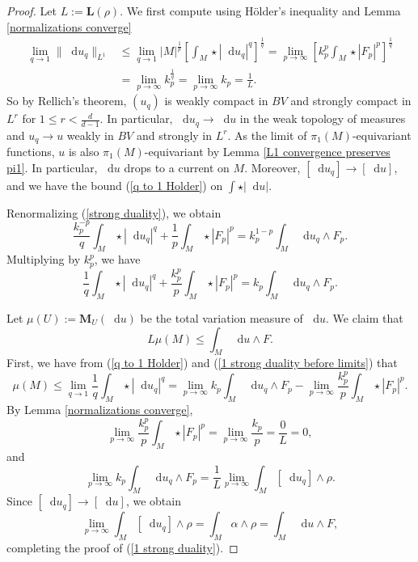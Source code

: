 \documentclass[reqno,11pt]{amsart}
\newcommand*\dif{\mathop{}\!\mathrm{d}}
\newcommand{\Mass}{\mathbf M}
\newcommand{\Comass}{\mathbf L}
\theoremstyle{definition}
\numberwithin{equation}{section}
\begin{document}
\begin{proof}
Let $L := \Comass(\rho)$.
We first compute using H\"older's inequality and Lemma \ref{normalizations converge}
\begin{align*}
\lim_{q \to 1} \|\dif u_q\|_{L^1}
&\leq \lim_{q \to 1} |M|^{\frac{1}{p}} \left[\int_M \star |\dif u_q|^q\right]^{\frac{1}{q}} = \lim_{p \to \infty} \left[k_p^p \int_M \star |F_p|^p\right]^{\frac{1}{q}} \\
&= \lim_{p \to \infty} k_p^{\frac{1}{q}} = \lim_{p \to \infty} k_p = \frac{1}{L}.
\end{align*}
So by Rellich's theorem, $(u_q)$ is weakly compact in $BV$ and strongly compact in $L^r$ for $1 \leq r < \frac{d}{d - 1}$.
In particular, $\dif u_q \to \dif u$ in the weak topology of measures and $u_q \to u$ weakly in $BV$ and strongly in $L^r$.
As the limit of $\pi_1(M)$-equivariant functions, $u$ is also $\pi_1(M)$-equivariant by Lemma \ref{L1 convergence preserves pi1}.
In particular, $\dif u$ drops to a current on $M$.
Moreover, $[\dif u_q] \to [\dif u]$, and we have the bound (\ref{q to 1 Holder}) on $\int \star |\dif u|$.

Renormalizing (\ref{strong duality}), we obtain 
$$\frac{k_p^{-p}}{q} \int_M \star |\dif u_q|^q + \frac{1}{p} \int_M \star |F_p|^p = k_p^{1 - p} \int_M \dif u_q \wedge F_p.$$
Multiplying by $k_p^p$, we have 
\begin{equation}\label{1 strong duality before limits}
	\frac{1}{q} \int_M \star |\dif u_q|^q + \frac{k_p^p}{p} \int_M \star |F_p|^p = k_p \int_M \dif u_q \wedge F_p.
\end{equation}

Let $\mu(U) := \Mass_U(\dif u)$ be the total variation measure of $\dif u$.
We claim that
\begin{equation}\label{1 strong duality}
	L\mu(M) \leq \int_M \dif u \wedge F.
\end{equation}
First, we have from (\ref{q to 1 Holder}) and (\ref{1 strong duality before limits}) that
$$\mu(M) \leq \lim_{q \to 1} \frac{1}{q} \int_M \star |\dif u_q|^q = \lim_{p \to \infty} k_p \int_M \dif u_q \wedge F_p - \lim_{p \to \infty} \frac{k_p^p}{p} \int_M \star |F_p|^p.$$
By Lemma \ref{normalizations converge},
$$\lim_{p \to \infty} \frac{k_p^p}{p} \int_M \star |F_p|^p = \lim_{p \to \infty} \frac{k_p}{p} = \frac{0}{L} = 0,$$
and
$$\lim_{p \to \infty} k_p \int_M \dif u_q \wedge F_p = \frac{1}{L} \lim_{p \to \infty} \int_M [\dif u_q] \wedge \rho.$$
Since $[\dif u_q] \to [\dif u]$, we obtain
$$\lim_{p \to \infty} \int_M [\dif u_q] \wedge \rho = \int_M \alpha \wedge \rho = \int_M \dif u \wedge F,$$
completing the proof of (\ref{1 strong duality}).


\end{proof}
\end{document}
